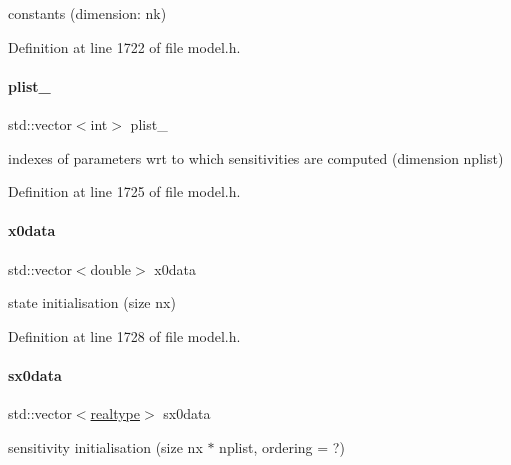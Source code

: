 constants (dimension\+: nk) 

Definition at line 1722 of file model.\+h.

\mbox{\label{classamici_1_1_model_a67919df701b4afd60d13fc890432d9ec}} 
\paragraph{\texorpdfstring{plist\+\_\+}{plist\_}}
{\footnotesize\ttfamily std\+::vector$<$int$>$ plist\+\_\+\hspace{0.3cm}{\ttfamily [protected]}}

indexes of parameters wrt to which sensitivities are computed (dimension nplist) 

Definition at line 1725 of file model.\+h.

\mbox{\label{classamici_1_1_model_ac305126c59aab952182f851679df24f9}} 
\paragraph{\texorpdfstring{x0data}{x0data}}
{\footnotesize\ttfamily std\+::vector$<$double$>$ x0data\hspace{0.3cm}{\ttfamily [protected]}}

state initialisation (size nx) 

Definition at line 1728 of file model.\+h.

\mbox{\label{classamici_1_1_model_a7ebdaf00a4177be525b45a39edf1865c}} 
\paragraph{\texorpdfstring{sx0data}{sx0data}}
{\footnotesize\ttfamily std\+::vector$<$\mbox{\hyperlink{namespaceamici_a1bdce28051d6a53868f7ccbf5f2c14a3}{realtype}}$>$ sx0data\hspace{0.3cm}{\ttfamily [protected]}}

sensitivity initialisation (size nx $\ast$ nplist, ordering = ?) 

